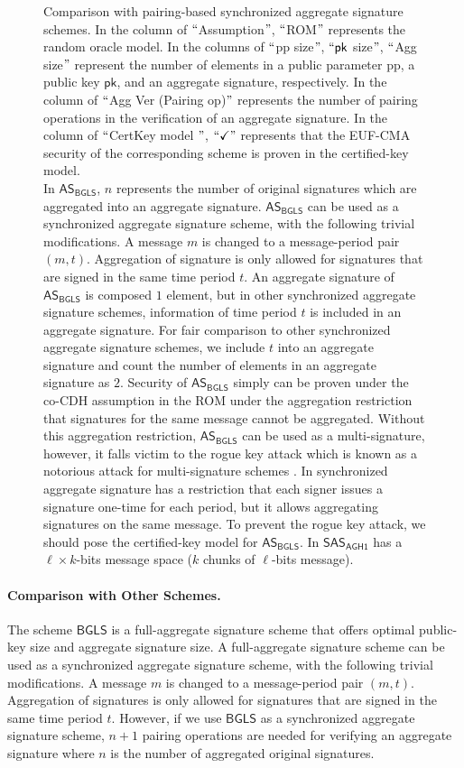 \documentclass[a4paper,11pt]{fullverllncs}
\newcommand{\pk}{\mathsf{pk}}
\newcommand{\AGHo}{\mathsf{AGH1}}
\newcommand{\AS}{\mathsf{AS}}
\newcommand{\BGLS}{\mathsf{BGLS}}
\newcommand{\SAS}{\mathsf{SAS}}
\begin{document}
\begin{figure}[h]
\caption{\small Comparison with pairing-based synchronized aggregate signature schemes.
In the column of $``$Assumption$"$, $``$ROM$"$ represents the random oracle model.
In the columns of $``$pp size$"$, $``\pk$ size$"$, $``$Agg size$"$ represent the number of elements in a public parameter pp, a public key $\pk$, and an aggregate signature, respectively.  
In the column of $``$Agg Ver (Pairing op)$"$ represents the number of pairing operations in the verification of an aggregate signature.
In the column of $``$CertKey model $"$, $``\checkmark"$ represents that the EUF-CMA security of the corresponding scheme is proven in the certified-key model.\\
In $\AS_{\BGLS}$, $n$ represents the number of original signatures which are aggregated into an aggregate signature.
$\AS_{\BGLS}$ can be used as a synchronized aggregate signature scheme, with the following trivial modifications.
A message $m$ is changed to a message-period pair $(m, t)$. Aggregation of signature is only allowed for signatures that are signed in the same time period $t$.
An aggregate signature of $\AS_{\BGLS}$ is composed $1$ element, but in other synchronized aggregate signature schemes, information of time period $t$ is included in an aggregate signature. 
For fair comparison to other synchronized aggregate signature schemes,  we include $t$ into an aggregate signature and count the number of elements in an aggregate signature as $2$.
Security of $\AS_{\BGLS}$ simply can be proven under the co-CDH assumption in the ROM under the aggregation restriction that signatures for the same message cannot be aggregated.
Without this aggregation restriction, $\AS_{\BGLS}$ can be used as a multi-signature, however, it falls victim to the rogue key attack which is known as a notorious attack for multi-signature schemes \cite{BDN18}.
In synchronized aggregate signature has a restriction that each signer issues a signature one-time for each period, but it allows aggregating signatures on the same message.
To prevent the rogue key attack, we should pose the certified-key model for $\AS_{\BGLS}$.
In  $\SAS_{\AGHo}$ has a $\ell \times k$-bits message space ($k$ chunks of $\ell$-bits message). \\
}

\label{SASListed}
\end{figure}

\paragraph{\bf Comparison with Other Schemes.}
The scheme $\BGLS$ \cite{BGLS03} is a full-aggregate signature scheme that offers optimal public-key size and aggregate signature size.
A full-aggregate signature scheme can be used as a synchronized aggregate signature scheme, with the following trivial modifications.
A message $m$ is changed to a message-period pair $(m, t)$.
Aggregation of signatures is only allowed for signatures that are signed in the same time period $t$.
However, if we use $\BGLS$ as a synchronized aggregate signature scheme, $n+1$ pairing operations are needed for verifying an aggregate signature where $n$ is the number of aggregated original signatures. 
\end{document}
